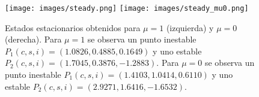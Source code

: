 \documentclass{article}
\begin{document}
\begin{figure}[H]
\centering
\texttt{[image: images/steady.png]}
\texttt{[image: images/steady\_mu0.png]}
\caption{Estados estacionarios obtenidos para $\mu = 1$ (izquierda) y $\mu = 0$ (derecha). Para $\mu = 1$ se observa un punto inestable $P_1(c,s,i) = (1.0826, 0.4885, 0.1649)$ y uno estable $P_2(c,s,i) = (1.7045, 0.3876, -1.2883)$. Para $\mu = 0$ se observa un punto inestable $P_1(c,s,i) = (1.4103, 1.0414, 0.6110)$ y uno estable $P_2(c,s,i) = (2.9271, 1.6416, -1.6532)$.}
\label{fig:steady_gral}
\end{figure}
\end{document}
